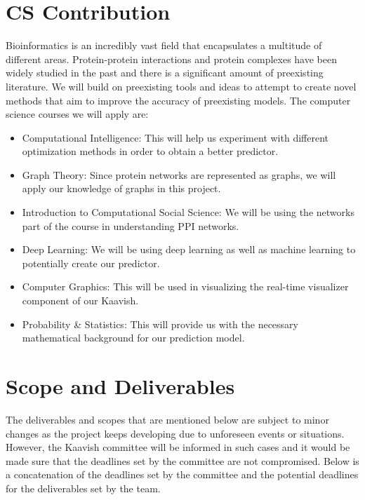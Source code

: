 \documentclass[11pt]{article}
\begin{document}
\section{CS Contribution}
\label{lblCSCont}
Bioinformatics is an incredibly vast field that encapsulates a multitude of different areas. Protein-protein
interactions and protein complexes have been widely studied in the past and there is a significant amount 
of preexisting literature. We will build on preexisting tools and ideas to attempt to create novel methods that
aim to improve the accuracy of preexisting models. The computer science courses we will apply are:
\begin{itemize}
    \item Computational Intelligence: This will help us experiment with
    different optimization methods in order to obtain a better predictor. 
    \item Graph Theory: Since protein networks are represented as graphs, we will apply our knowledge of 
    graphs in this project.
    \item Introduction to Computational Social Science: We will be using the networks part of the course 
    in understanding PPI networks.
    \item Deep Learning: We will be using deep learning as well as machine learning to potentially create
    our predictor.
    \item Computer Graphics: This will be used in visualizing the real-time visualizer component of our 
    Kaavish.
    \item Probability \& Statistics: This will provide us with the necessary mathematical background 
    for our prediction model.
\end{itemize}

\section{Scope and Deliverables}
\label{lblScope}
The deliverables and scopes that are mentioned below are subject to minor changes as the project keeps 
developing due to unforeseen events or situations. However, the Kaavish committee will be informed in such 
cases and it would be made sure that the deadlines set by the committee are not compromised. Below is a 
concatenation of the deadlines set by the committee and the potential deadlines for the deliverables set by 
the team.
\end{document}
